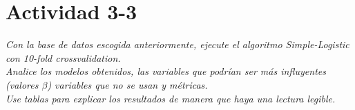 \clearpage
\section{Actividad 3-3}
\label{p33}
\begin{center}
    \parbox{12cm}{\justify\textit{Con la base de datos escogida anteriormente, ejecute el algoritmo Simple-Logistic con 10-fold crossvalidation. \\
    Analice los modelos obtenidos, las variables que podrían ser más influyentes (valores $\beta$) variables que no se usan y métricas. \\
    Use tablas para explicar los resultados de manera que haya una lectura legible.}}
\end{center}